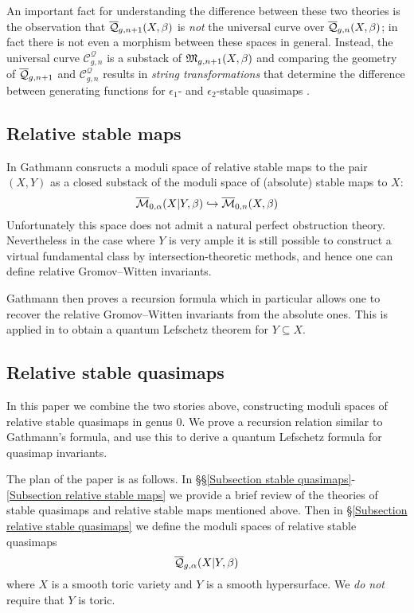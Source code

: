 An important fact for understanding the difference between these two theories is the observation that $\overline{\mathcal Q}_{g,n+1}(X,\beta)$ is \emph{not} the universal curve over $\overline{\mathcal Q}_{g,n}(X,\beta)$; in fact there is not even a morphism between these spaces in general. Instead, the universal curve $\mathcal C_{g,n}^\mathcal{Q}$ is a substack of $\mathfrak M_{g,n+1}(X,\beta)$ and comparing the geometry of $\overline{\mathcal{Q}}_{g,n+1}$ and $\mathcal{C}^{\mathcal{Q}}_{g,n}$ results in \emph{string transformations} that determine the difference between generating functions for $\epsilon_1$- and $\epsilon_2$-stable quasimaps \cite[\S 6 and 7]{CF-K-wallcrossing}.

\subsection{Relative stable maps}
In \cite{Ga} Gathmann consructs a moduli space of relative stable maps to the pair $(X,Y)$ as a closed substack of the moduli space of (absolute) stable maps to $X$:
\begin{equation*} \overline{\mathcal M}_{0,\alpha}(X|Y,\beta) \hookrightarrow \overline{\mathcal M}_{0,n}(X,\beta) \end{equation*}
Unfortunately this space does not admit a natural perfect obstruction theory. Nevertheless in the case where $Y$ is very ample it is still possible to construct a virtual fundamental class by intersection-theoretic methods, and hence one can define relative Gromov--Witten invariants.

Gathmann then proves a recursion formula which in particular allows one to recover the relative Gromov--Witten invariants from the absolute ones. This is  applied in \cite{Ga-MF} to obtain a quantum Lefschetz theorem for $Y \subseteq X$.

\subsection{Relative stable quasimaps}
In this paper we combine the two stories above, constructing moduli spaces of relative stable quasimaps in genus $0$. We prove a recursion relation similar to Gathmann's formula, and use this to derive a quantum Lefschetz formula for quasimap invariants.

The plan of the paper is as follows. In \S\S \ref{Subsection stable quasimaps}-\ref{Subsection relative stable maps} we provide a brief review of the theories of stable quasimaps and relative stable maps mentioned above. Then in \S \ref{Subsection relative stable quasimaps} we define the moduli spaces of relative stable quasimaps
\begin{equation*} \overline{\mathcal Q}_{g,\alpha}(X|Y,\beta) \end{equation*}
where $X$ is a smooth toric variety and $Y$ is a smooth hypersurface. We \emph{do not} require that $Y$ is toric.

